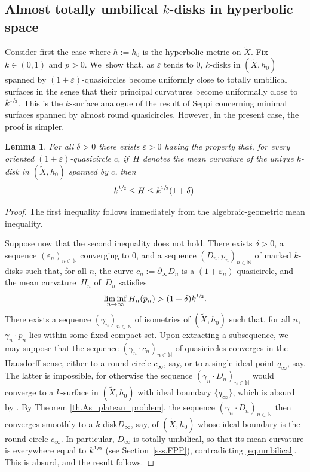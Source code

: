 \documentclass[JEP,XML,SOM,Unicode,NoEqCountersInSection,published]{cedram}
\newcommand{\ksurface}{$k$\nobreakdash-surface\xspace}
\newcommand{\kdisk}{$k$\nobreakdash-disk\xspace}
\newcommand{\kdisks}{$k$\nobreakdash-disks\xspace}
\theoremstyle{plain}
\newtheorem{lemma}[theorem]{Lemma}
\theoremstyle{definition}
\newcommand{\N}{{\mathbb N}}
\let\eps\varepsilon
\newcommand{\bord}{\partial_{\infty}}
\begin{document}
\subsection{Almost totally umbilical \kdisks in hyperbolic space}\label{ss.totally_umb} Consider first the case where $h:=h_0$ is the hyperbolic metric on $\tilde{X}$. Fix $k\in(0,1)$ and $p>0$. We~show that, as $\eps$ tends to $0$, \kdisks in $(\tilde{X},h_0)$ spanned by $(1+\eps)$-quasicircles become uniformly close to totally umbilical surfaces in the sense that their principal curvatures become uniformally close to $k^{\sfrac{1}{2}}$. This is the \ksurface analogue of the result \cite{Seppi} of Seppi concerning minimal surfaces spanned by almost round quasicircles. However, in the present case, the proof is simpler.

\begin{lemma}\label{l.almost_tot_umbilical}
For all $\delta>0$ there exists $\eps>0$ having the property that, for every oriented $(1+\eps)$-quasicircle $c$, if~$H$ denotes the mean curvature of the unique \kdisk in $(\tilde{X},h_0)$ spanned by $c$, then
\begin{equation*}
k^{\sfrac{1}{2}}\leq H\leq k^{\sfrac{1}{2}}(1+\delta).
\end{equation*}
\end{lemma}

\begin{proof}
The first inequality follows immediately from the algebraic-geometric mean inequality.

Suppose now that the second inequality does not hold. There exists $\delta>0$, a sequence $(\eps_n)_{n\in\N}$ converging to $0$, and a sequence $(D_n,p_n)_{n\in\N}$ of marked \kdisks such that, for all $n$, the curve $c_n:=\bord D_n$ is a $(1+\eps_n)$-quasicircle, and the mean curvature~$H_n$ of~$D_n$ satisfies
\begin{equation}\label{eq.umbilical}
\liminf_{n\to\infty} H_n(p_n)>(1+\delta)k^{\sfrac{1}{2}}.
\end{equation}
There exists a sequence $(\gamma_n)_{n\in\N}$ of isometries of $(\tilde{X},h_0)$ such that, for all $n$, $\gamma_n\cdot p_n$ lies within some fixed compact set. Upon extracting a subsequence, we may suppose that the sequence $(\gamma_n\cdot c_n)_{n\in\N}$ of quasicircles converges in the Hausdorff sense, either to a round circle $c_\infty$, say, or to a single ideal point $q_\infty$, say. The latter is impossible, for otherwise the sequence $(\gamma_n\cdot D_n)_{n\in\N}$ would converge to a \ksurface in $(\tilde{X},h_0)$ with ideal boundary $\{q_\infty\}$, which is absurd by \cite[Prop.\,2.5.3]{LabourieInvent}. By Theorem \ref{th.As_plateau_problem}, the sequence $(\gamma_n\cdot D_n)_{n\in\N}$ then converges smoothly to a \kdisk $D_\infty$, say, of $(\tilde{X},h_0)$ whose ideal boundary is the round circle $c_\infty$. In particular, $D_\infty$ is totally umbilical, so that its mean curvature is everywhere equal to $k^{\sfrac{1}{2}}$ (see Section~\ref{sss.FPP}), contradicting \eqref{eq.umbilical}. This is absurd, and the result follows.
\end{proof}
\end{document}
